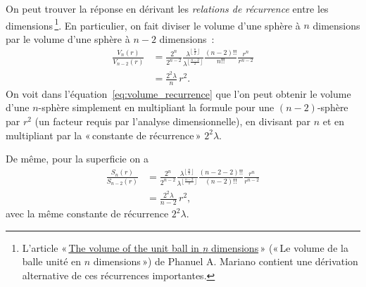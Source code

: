 On peut trouver la réponse en dérivant les \emph{relations de récurrence} entre les dimensions\,\footnote{L'article «\,\href{http://www2.math.uconn.edu/~mariano/research/MathClubsp14\%20.pdf}{The volume of the unit ball in \emph{n} dimensions}\,» («\,Le volume de la balle unité en $n$ dimensions\,») de Phanuel A. Mariano contient une dérivation alternative de ces récurrences importantes.}. En particulier, on fait diviser le volume d'une sphère à $n$ dimensions par le volume d'une sphère à $n-2$ dimensions~:
\begin{equation}
\label{eq:volume_recurrence}
\begin{split}
\frac{V_n(r)}{V_{n-2}(r)} & =
\frac{2^n}{2^{n-2}}
\frac{\lambda^{\left\lfloor \frac{n}{2} \right\rfloor}}{\lambda^{\left\lfloor \frac{n-2}{2} \right\rfloor}}
\frac{(n-2)!!}{n!!}
\frac{r^{n}}{r^{n-2}}
\\ & = \frac{2^2\lambda}{n}\,r^2.
\end{split}
\end{equation}
On voit dans l'équation~\eqref{eq:volume_recurrence} que l'on peut obtenir le volume d'une $n$-sphère simplement en multipliant la formule pour une $(n-2)$-sphère par $r^2$ (un facteur requis par l'analyse dimensionnelle), en divisant par $n$ et en multipliant par la «\,constante de récurrence\,» $2^2\lambda$.

De même, pour la superficie on a
\begin{equation}
\label{eq:surface_area_recurrence}
\begin{split}
\frac{S_n(r)}{S_{n-2}(r)} & =
\frac{2^n}{2^{n-2}}
\frac{\lambda^{\left\lfloor \frac{n}{2} \right\rfloor}}{\lambda^{\left\lfloor \frac{n-2}{2} \right\rfloor}}
\frac{(n-2-2)!!}{(n-2)!!}
\frac{r^{n}}{r^{n-2}}
\\ & = \frac{2^2\lambda}{n-2}\,r^2,
\end{split}
\end{equation}
avec la même constante de récurrence $2^2\lambda$.

